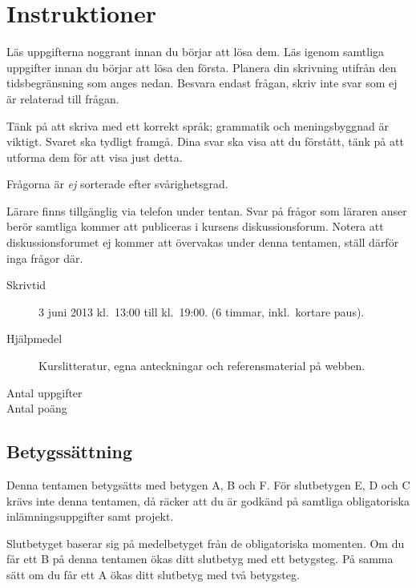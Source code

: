 \documentclass[a4paper,addpoints]{miunexam}
\author{%
  Daniel Bosk\\
  \small\texttt{\href{mailto:daniel.bosk@miun.se}{daniel.bosk@miun.se}}\\
  \small Telefon: 060-14\,8709
}
\date{2013-06-03}
\begin{document}
\maketitle
\thispagestyle{foot}

\section*{Instruktioner}
\noindent
Läs uppgifterna noggrant innan du börjar att lösa dem.
Läs igenom samtliga uppgifter innan du börjar att lösa den första.
Planera din skrivning utifrån den tidsbegränsning som anges nedan.
Besvara endast frågan, skriv inte svar som ej är relaterad till frågan.

Tänk på att skriva med ett korrekt språk; grammatik och meningsbyggnad är 
viktigt.
Svaret ska tydligt framgå.
Dina svar ska visa att du förstått, tänk på att utforma dem för att visa just 
detta.

Frågorna är \emph{ej} sorterade efter svårighetsgrad.

Lärare finns tillgänglig via telefon under tentan.
Svar på frågor som läraren anser berör samtliga kommer att publiceras i kursens
diskussionsforum.
Notera att diskussionsforumet ej kommer att övervakas under denna tentamen, 
ställ därför inga frågor där.

\begin{description}
  \item[Skrivtid] 3 juni 2013 kl.\ 13:00 till kl.\ 19:00.
    (6 timmar, inkl.\ kortare paus).
	\item[Hjälpmedel] Kurslitteratur, egna anteckningar och referensmaterial på
		webben.
	\item[Antal uppgifter] \numquestions
	\item[Antal poäng] \numpoints
\end{description}


\subsection*{Betygssättning}
\noindent
Denna tentamen betygsätts med betygen A, B och F.
För slutbetygen E, D och C krävs inte denna tentamen, då räcker att du är 
godkänd på samtliga obligatoriska inlämningsuppgifter samt projekt.

Slutbetyget baserar sig på medelbetyget från de obligatoriska momenten.
Om du får ett B på denna tentamen ökas ditt slutbetyg med ett betygsteg.
På samma sätt om du får ett A ökas ditt slutbetyg med två betygsteg.
\end{document}

